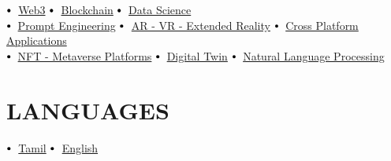 \documentclass[letterpaper,11pt]{article}
\newcommand\sbullet[1][.5]{\mathbin{\vcenter{\hbox{\scalebox{#1}{$\bullet$}}}}}
\begin{document}
{{{{{$\sbullet[.75] \hspace{0.1cm}$ {\href{certificateLink.com}{Web3}} \hspace{4.45cm}
$\sbullet[.75] \hspace{0.1cm}$ {\href{certificateLink.com}{Blockchain}} \hspace{4.5cm}
\vspace{2pt}
$\sbullet[.75] \hspace{0.2cm}${\href{certificateLink.com} {Data Science}}\\

$\sbullet[.75] \hspace{0.2cm}${\href{certificateLink.com}{Prompt Engineering}} \hspace{1.85cm}
\vspace{2pt}
$\sbullet[.75] \hspace{0.1cm}$ {\href{certificateLink.com}{AR - VR - Extended Reality}} \hspace{1.25cm}
$\sbullet[.75] \hspace{0.2cm}${\href{certificateLink.com}{Cross Platform Applications}} \\
 \vspace{2pt}
$\sbullet[.75] \hspace{0.2cm}${\href{certificateLink.com}{NFT - Metaverse Platforms}} \hspace{0.55cm}
 \vspace{2pt}
$\sbullet[.75] \hspace{0.2cm}${\href{certificateLink.com}{Digital Twin}} \hspace{4.15cm}
 \vspace{2pt}
$\sbullet[.75] \hspace{0.2cm}${\href{certificateLink.com}{Natural Language Processing}} \hspace{0.5cm}



\section{LANGUAGES}

$\sbullet[.75] \hspace{0.1cm}$ {\href{certificateLink.com}{Tamil}} \hspace{4.45cm}
$\sbullet[.75] \hspace{0.1cm}$ {\href{certificateLink.com}{English}} \hspace{5.6cm}



}}}}}
\end{document}
